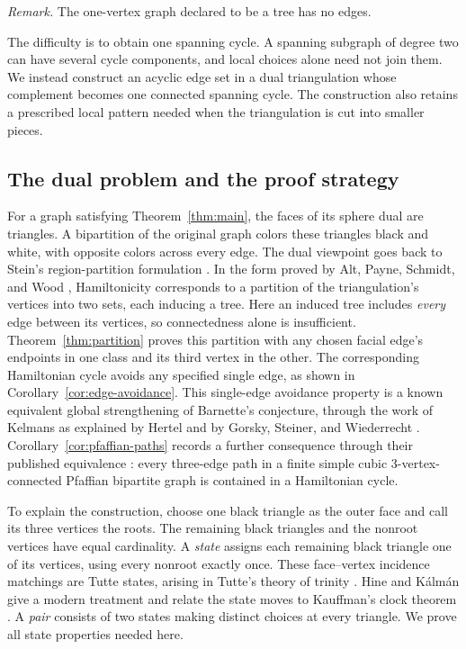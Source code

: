 \documentclass[11pt]{article}
\theoremstyle{remark}
\numberwithin{equation}{section}
\begin{document}
\noindent\textit{Remark.} The one-vertex graph declared to be a tree has no edges.


The difficulty is to obtain one spanning cycle. A spanning subgraph
of degree two can have several cycle components, and local choices
alone need not join them. We instead construct an acyclic edge set
in a dual triangulation whose complement becomes one connected
spanning cycle. The construction also retains a prescribed local
pattern needed when the triangulation is cut into smaller pieces.

\subsection{The dual problem and the proof strategy}

For a graph satisfying Theorem~\ref{thm:main}, the faces of its sphere
dual are triangles.
A bipartition of the original graph colors these triangles black
and white, with opposite colors across every edge. The dual viewpoint goes back to Stein's region-partition formulation
\cite[Theorem~2.2]{Stein1971}. In the form proved by Alt, Payne,
Schmidt, and Wood \cite[Lemma~5]{APSW2016}, Hamiltonicity corresponds
to a partition of the triangulation's vertices into two sets, each
inducing a tree. Here an induced tree includes \emph{every}
edge between its vertices, so connectedness alone is insufficient.
Theorem~\ref{thm:partition} proves this partition with any chosen
facial edge's endpoints in one class and its third vertex in the
other. The corresponding Hamiltonian cycle avoids any specified
single edge, as shown in Corollary~\ref{cor:edge-avoidance}. This
single-edge avoidance property is a known equivalent global
strengthening of Barnette's conjecture, through the work of Kelmans
as explained by Hertel \cite[Corollary~3]{Hertel2005} and by
Gorsky, Steiner, and Wiederrecht \cite[Theorem~4.3]{GSW2023}.
Corollary~\ref{cor:pfaffian-paths} records a further consequence
through their published equivalence \cite[Theorem~4.16]{GSW2023}:
every three-edge path in a finite simple cubic \(3\)-vertex-connected Pfaffian
bipartite graph is contained in a Hamiltonian cycle.

To explain the construction, choose one black triangle as the outer
face and call its three vertices the roots. The remaining black
triangles and the nonroot vertices have equal cardinality. A
\emph{state} assigns each remaining black triangle one of its vertices,
using every nonroot exactly once. These face--vertex incidence
matchings are Tutte states, arising in Tutte's theory of trinity
\cite{Tutte1975}. Hine and K\'alm\'an give a modern treatment and
relate the state moves to Kauffman's clock theorem \cite{HK2018}.
A \emph{pair} consists of two states making distinct
choices at every triangle. We prove all state properties needed here.
\end{document}
